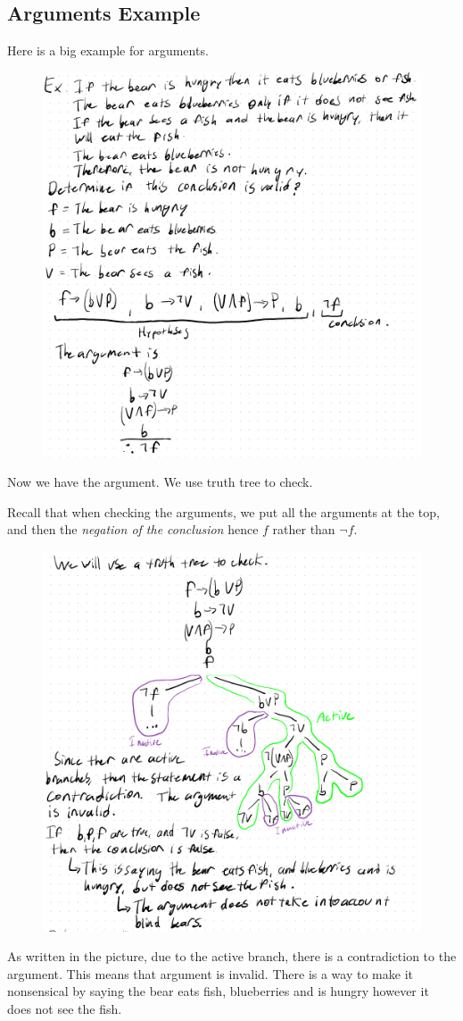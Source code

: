 \documentclass[12pt,letterpaper]{article} \usepackage{amsmath} \usepackage{graphicx}  \usepackage{longtable}  \usepackage{amssymb}
\begin{document}
        \subsection{Arguments Example}
        Here is a big example for arguments. 

        \begin{figure}[H]
            \centering
            \includegraphics[width=0.7\linewidth]{ex4 1.png}
            
        \end{figure}

        Now we have the argument. We use truth tree to check.

        Recall that when checking the arguments, we put all the arguments at the top, and then the \emph{negation of the conclusion} hence $f$ rather than $\lnot f$.

        \begin{figure}[H]
            \centering
            \includegraphics[width=0.7\linewidth]{ex4 2.png}
            
        \end{figure}

        As written in the picture, due to the active branch, there is a contradiction to the argument. This means that argument is invalid. There is a way to make it nonsensical by saying the bear eats fish, blueberries and is hungry however it does not see the fish. 
    
        
\end{document}
